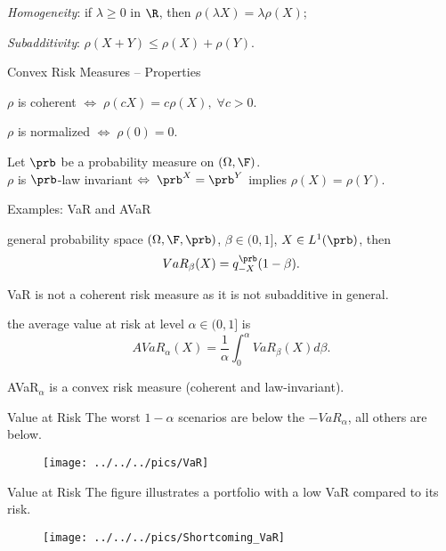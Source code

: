 	\emph{Homogeneity}: if $\lambda \geq 0$ in $\R$, then $\rho(\lambda X)
= \lambda \rho (X)$;

	\emph{Subadditivity}: $\rho(X+Y)\leq \rho(X)+\rho(Y)$.






{Convex Risk Measures -- Properties}






	$\rho$ is coherent $\Leftrightarrow \; \rho(cX) = c \rho(X), \; \forall c>0$.

	$\rho$ is normalized $\Leftrightarrow \; \rho(0) = 0$.

	Let $\prb$ be a probability measure on $(\Omega, \F)$.\\
$\rho$ is $\prb$-law invariant $\Leftrightarrow \; \prb^X = \prb^Y $ implies $\rho(X) = \rho(Y)$.






{Examples: VaR and AVaR}






	general probability space $(\Omega, \F, \prb)$, $\beta \in (0,1]$, $X\in L^1(\prb)$, then
$$
VaR_\beta(X) = q_{-X}^{\prb}(1-\beta).
$$

	VaR is not a coherent risk measure as it is not subadditive in general.

	the average value at risk at level $\alpha \in (0,1]$ is
$$
AVaR_\alpha(X) = \frac{1}{\alpha} \int_0^\alpha VaR_\beta(X) d\beta.
$$

	AVaR$_\alpha$ is a convex risk measure (coherent and law-invariant).






{Value at Risk}
The worst $1-\alpha$ scenarios are below the $-VaR_\alpha$, all others are below.
\begin{figure}
	\centering
		\texttt{[image: ../../../pics/VaR]}
	\label{fig:VaR}
\end{figure}

{Value at Risk}
The figure illustrates a portfolio with a low VaR compared to its risk.
\begin{figure}
	\centering
		\texttt{[image: ../../../pics/Shortcoming\_VaR]}
	\label{fig:Shortcoming_VaR}
\end{figure}

